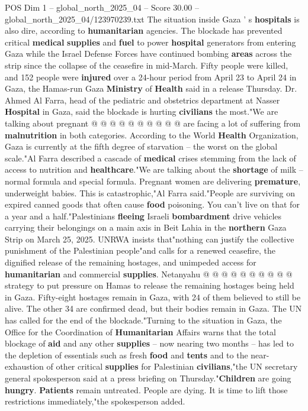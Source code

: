 \begin{textsample}{POS Dim 1 – global\_north\_2025\_04 – Score 30.00 – global\_north\_2025\_04/123970239.txt}
The situation inside Gaza ' s \textbf{hospitals} is also dire, according to \textbf{humanitarian} agencies.
The blockade has prevented critical \textbf{medical} \textbf{supplies} and \textbf{fuel} to power \textbf{hospital} generators from entering Gaza while the Israel Defense Forces have continued bombing \textbf{areas} across the strip since the collapse of the ceasefire in mid-March.
Fifty people were killed, and 152 people were \textbf{injured} over a 24-hour period from April 23 to April 24 in Gaza, the Hamas-run Gaza \textbf{Ministry} of \textbf{Health} said in a release Thursday.
Dr.
Ahmed Al Farra, head of the pediatric and obstetrics department at Nasser \textbf{Hospital} in Gaza, said the blockade is hurting \textbf{civilians} the most."We are talking about pregnant @ @ @ @ @ @ @ @ @ @ are facing a lot of suffering from \textbf{malnutrition} in both categories.
According to the World \textbf{Health} Organization, Gaza is currently at the fifth degree of starvation -- the worst on the global scale."Al Farra described a cascade of \textbf{medical} crises stemming from the lack of access to nutrition and \textbf{healthcare}."We are talking about the \textbf{shortage} of milk -- normal formula and special formula.
Pregnant women are delivering \textbf{premature}, underweight babies.
This is catastrophic,"Al Farra said."People are surviving on expired canned goods that often cause \textbf{food} poisoning.
You can't live on that for a year and a half."Palestinians \textbf{fleeing} Israeli \textbf{bombardment} drive vehicles carrying their belongings on a main axis in Beit Lahia in the \textbf{northern} Gaza Strip on March 25, 2025.
UNRWA insists that"nothing can justify the collective punishment of the Palestinian people"and calls for a renewed ceasefire, the dignified release of the remaining hostages, and unimpeded access for \textbf{humanitarian} and commercial \textbf{supplies}.
Netanyahu @ @ @ @ @ @ @ @ @ @ strategy to put pressure on Hamas to release the remaining hostages being held in Gaza.
Fifty-eight hostages remain in Gaza, with 24 of them believed to still be alive.
The other 34 are confirmed dead, but their bodies remain in Gaza.
The UN has called for the end of the blockade."Turning to the situation in Gaza, the Office for the Coordination of \textbf{Humanitarian} Affairs warns that the total blockage of \textbf{aid} and any other \textbf{supplies} -- now nearing two months -- has led to the depletion of essentials such as fresh \textbf{food} and \textbf{tents} and to the near-exhaustion of other critical \textbf{supplies} for Palestinian \textbf{civilians},"the UN secretary general spokesperson said at a press briefing on Thursday."\textbf{Children} are going \textbf{hungry}. \textbf{Patients} remain untreated.
People are dying.
It is time to lift those restrictions immediately,"the spokesperson added.

\end{textsample}

